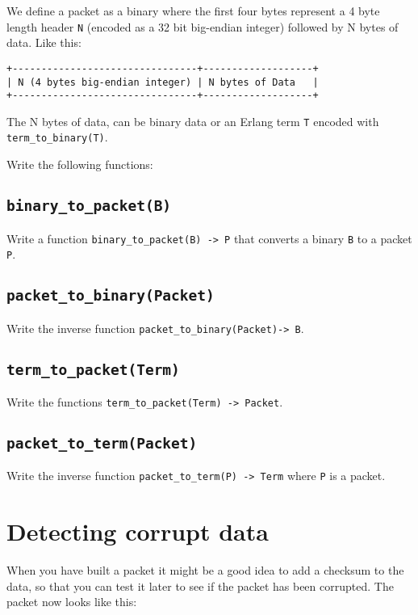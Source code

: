 \documentclass[12pt]{hitec}
\begin{document}
We define a packet as a binary where the first four bytes represent a
4 byte length header \verb+N+ (encoded as a 32 bit big-endian integer)
followed by N bytes of data. Like this:

\begin{verbatim}
+--------------------------------+-------------------+
| N (4 bytes big-endian integer) | N bytes of Data   |
+--------------------------------+-------------------+
\end{verbatim}


The N bytes of data, can be binary data or an Erlang term \verb+T+
encoded with \verb+term_to_binary(T)+.


Write the following functions:

\subsection{\texttt{binary\_to\_packet(B)}}

Write a function \verb+binary_to_packet(B) -> P+ that converts a
binary \verb+B+ to a packet \verb+P+.

\subsection{\texttt{packet\_to\_binary(Packet)}}
Write the inverse function \verb+packet_to_binary(Packet)-> B+.


\subsection{\texttt{term\_to\_packet(Term)}}
Write the functions \verb+term_to_packet(Term) -> Packet+.

\subsection{\texttt{packet\_to\_term(Packet)}}

Write the inverse
function \verb+packet_to_term(P) -> Term+ where \verb+P+ is a packet.

\section{Detecting corrupt data}

When you have built a packet it might be a good idea to add a checksum
to the data, so that you can test it later to see if the packet has
been corrupted. The packet now looks like this:
\end{document}
